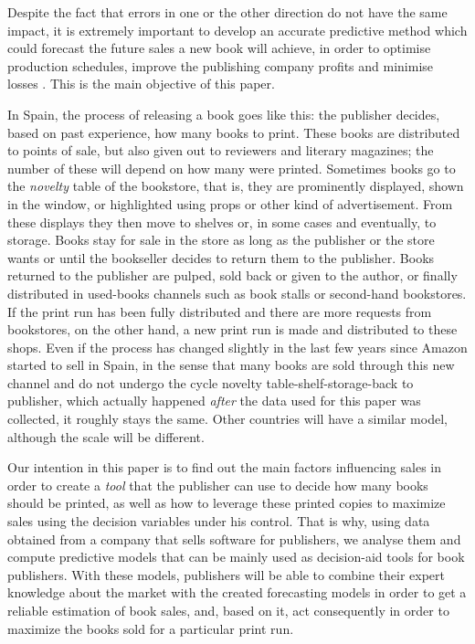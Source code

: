 \documentclass[a4paper,10pt,twocolumn,preprint,3p]{elsarticle}
\begin{document}
Despite the fact that errors in one or the other direction do not have
the same impact, it is extremely important to develop an accurate
predictive method 
which could forecast the future sales a new book will achieve, in
order to optimise production schedules, improve the publishing company
profits and minimise losses \cite{Zhao2001}. This is the main objective of this paper.

In Spain, the process of releasing a book goes like this: the
publisher decides, based on past experience, how many books to
print. These books are distributed to points of sale, but also given
out to reviewers and literary magazines; the number of these will
depend on how many were printed. Sometimes books go to
the {\em novelty} table of the bookstore, that is, they are prominently displayed, shown in the window, or highlighted using props or other 
kind of advertisement. From these displays they then move to shelves
or, in some cases and eventually, to storage. Books stay for sale in the store as long as the publisher or the store wants or until the bookseller decides to return them to the publisher. Books returned to the publisher are pulped, sold back or given to the author, or finally distributed in used-books channels such as book stalls or second-hand bookstores. If the print run has been fully
distributed and there are more requests from bookstores, on the other
hand, a new print run is made and distributed to these shops. 
Even if the process has changed slightly 
in the last few years since Amazon started to sell in Spain, in the
sense that many books are sold through this new channel and do not
undergo the cycle novelty table-shelf-storage-back to publisher, which
actually happened {\em after} the data used for this paper was
collected, it roughly stays the same. Other countries will have a
similar model, although the scale will be different. 

Our intention in this paper is to find out the main factors influencing
sales in order to create a \textit{tool} that the publisher can use to decide how many books should be printed, as well as how to leverage these printed
copies to maximize sales using the decision variables under his
control. That is why, using data obtained from a company that sells
software for publishers, we analyse them and compute predictive models that can be mainly used as decision-aid tools for book publishers. With these models, publishers will be able to combine their expert knowledge about the market with the created forecasting models in order to get a reliable estimation of book
sales, and, based on it, act consequently in order to maximize the books sold for a particular print run. 
\end{document}
